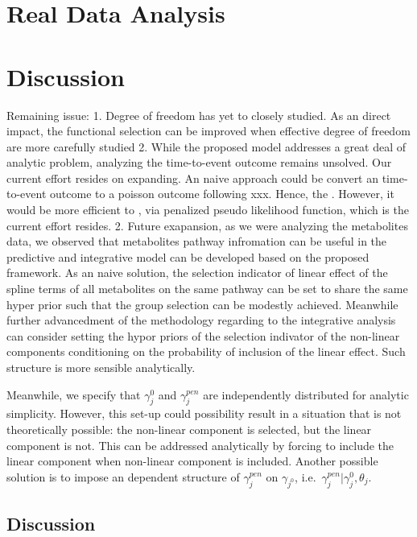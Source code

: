 \documentclass[AMA,STIX1COL,]{WileyNJD-v2}
\begin{document}
\hypertarget{real-data-analysis}{%
\section{Real Data Analysis}\label{real-data-analysis}}

\hypertarget{discussion}{%
\section{Discussion}\label{discussion}}

Remaining issue: 1. Degree of freedom has yet to closely studied. As an
direct impact, the functional selection can be improved when effective
degree of freedom are more carefully studied 2. While the proposed model
addresses a great deal of analytic problem, analyzing the time-to-event
outcome remains unsolved. Our current effort resides on expanding. An
naive approach could be convert an time-to-event outcome to a poisson
outcome following xxx. Hence, the . However, it would be more efficient
to , via penalized pseudo likelihood function, which is the current
effort resides. 2. Future exapansion, as we were analyzing the
metabolites data, we observed that metabolites pathway infromation can
be useful in the predictive and integrative model can be developed based
on the proposed framework. As an naive solution, the selection indicator
of linear effect of the spline terms of all metabolites on the same
pathway can be set to share the same hyper prior such that the group
selection can be modestly achieved. Meanwhile further advancedment of
the methodology regarding to the integrative analysis can consider
setting the hypor priors of the selection indivator of the non-linear
components conditioning on the probability of inclusion of the linear
effect. Such structure is more sensible analytically.

Meanwhile, we specify that \(\gamma_{j}^0\) and \(\gamma_{j}^{pen}\) are
independently distributed for analytic simplicity. However, this set-up
could possibility result in a situation that is not theoretically
possible: the non-linear component is selected, but the linear component
is not. This can be addressed analytically by forcing to include the
linear component when non-linear component is included. Another possible
solution is to impose an dependent structure of \(\gamma_{j}^{pen}\) on
\(\gamma_{j^{0}}\), i.e.~\(\gamma_j^{pen}|\gamma_{j}^{0}, \theta_j\).

\hypertarget{discussion-1}{%
\subsection{Discussion}\label{discussion-1}}
\end{document}
